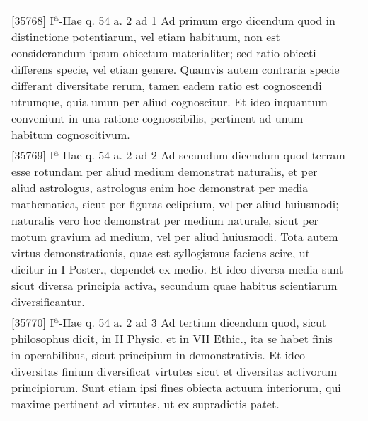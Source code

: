 \documentclass[10pt]{jsarticle} %
\begin{document}
\begin{longtable}{p{21em}p{21em}}
&

\\


[35768] Iª-IIae q. 54 a. 2 ad 1
Ad primum ergo dicendum quod in distinctione potentiarum, vel etiam habituum, non est considerandum ipsum obiectum materialiter; sed ratio obiecti differens specie, vel etiam genere. Quamvis autem contraria specie differant diversitate rerum, tamen eadem ratio est cognoscendi utrumque, quia unum per aliud cognoscitur. Et ideo inquantum conveniunt in una ratione cognoscibilis, pertinent ad unum habitum cognoscitivum.

&

\\


[35769] Iª-IIae q. 54 a. 2 ad 2
Ad secundum dicendum quod terram esse rotundam per aliud medium demonstrat naturalis, et per aliud astrologus, astrologus enim hoc demonstrat per media mathematica, sicut per figuras eclipsium, vel per aliud huiusmodi; naturalis vero hoc demonstrat per medium naturale, sicut per motum gravium ad medium, vel per aliud huiusmodi. Tota autem virtus demonstrationis, quae est syllogismus faciens scire, ut dicitur in I Poster., dependet ex medio. Et ideo diversa media sunt sicut diversa principia activa, secundum quae habitus scientiarum diversificantur.

&

\\


[35770] Iª-IIae q. 54 a. 2 ad 3
Ad tertium dicendum quod, sicut philosophus dicit, in II Physic. et in VII Ethic., ita se habet finis in operabilibus, sicut principium in demonstrativis. Et ideo diversitas finium diversificat virtutes sicut et diversitas activorum principiorum. Sunt etiam ipsi fines obiecta actuum interiorum, qui maxime pertinent ad virtutes, ut ex supradictis patet.

&




\end{longtable}
\newpage
\end{document}
